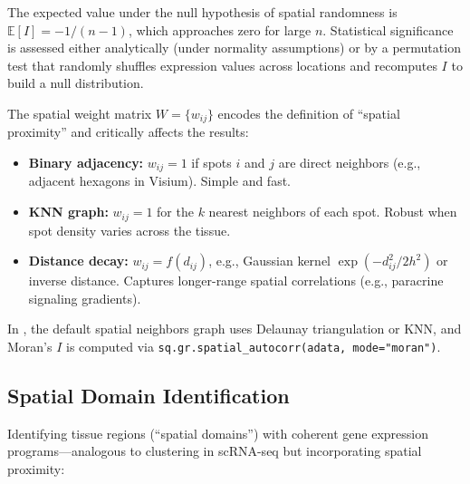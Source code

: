 The expected value under the null hypothesis of spatial randomness is
$\mathbb{E}[I] = -1/(n-1)$, which approaches zero for large $n$.
Statistical significance is assessed either analytically (under normality
assumptions) or by a permutation test that randomly shuffles expression values
across locations and recomputes $I$ to build a null distribution.

\begin{keyconcept}[title={Choosing the Spatial Weight Matrix}]
The spatial weight matrix $W = \{w_{ij}\}$ encodes the definition of ``spatial
proximity'' and critically affects the results:
\begin{itemize}[nosep]
  \item \textbf{Binary adjacency:} $w_{ij} = 1$ if spots $i$ and $j$ are direct
    neighbors (e.g., adjacent hexagons in Visium). Simple and fast.
  \item \textbf{KNN graph:} $w_{ij} = 1$ for the $k$ nearest neighbors of each
    spot. Robust when spot density varies across the tissue.
  \item \textbf{Distance decay:} $w_{ij} = f(d_{ij})$, e.g., Gaussian kernel
    $\exp(-d_{ij}^2 / 2h^2)$ or inverse distance. Captures longer-range spatial
    correlations (e.g., paracrine signaling gradients).
\end{itemize}
In , the default spatial neighbors graph uses Delaunay
triangulation or KNN, and Moran's $I$ is computed via
\texttt{sq.gr.spatial\_autocorr(adata, mode="moran")}.
\end{keyconcept}

\subsection{Spatial Domain Identification}

Identifying tissue regions (``spatial domains'') with coherent gene expression
programs---analogous to clustering in scRNA-seq but incorporating spatial
proximity:


